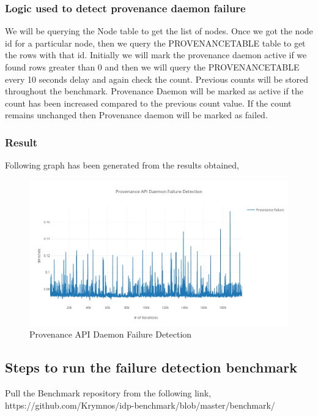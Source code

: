 \subsubsection{Logic used to detect provenance daemon failure}

We will be querying the Node table to get the list of nodes. Once we got the node id for a particular node, then we query the PROVENANCETABLE table to get the rows with that id. Initially we will mark the provenance daemon active if we found rows greater than 0 and then we will query the PROVENANCETABLE every 10 seconds delay and again check the count. Previous counts will be stored throughout the benchmark. Provenance Daemon will be marked as active if the count has been increased compared to the previous count value. If the count remains unchanged then Provenance daemon will be marked as failed.

\subsubsection{Result}

Following graph has been generated from the results obtained,

\begin{figure}[H]
	\center
	\includegraphics[width=1\textwidth]{figures/benchmark_provenance.png}
	\caption{Provenance API Daemon Failure Detection}
	\label{fig:benchmark_provenance}
\end{figure}

\subsection{Steps to run the failure detection benchmark}

Pull the Benchmark repository from the following link,
https://github.com/Krymnos/idp-benchmark/blob/master/benchmark/


